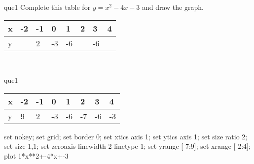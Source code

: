 \documentclass[13.5pt, varwidth=true]{beamer}
\begin{document}
\begin{frame}[shrink=19,fragile]
	\begin{beamercolorbox}[rounded=true, left, shadow=true,wd=14.8cm]{que1}
		 Complete this table for $y = x^{2} - 4x - 3$ and draw the graph. \\[0.3cm] \renewcommand{\arraystretch}{1.2}\begin{tabular}{|C|C|C|C|C|C|C|C|} \hline x & -2 & -1 & 0 & 1 & 2 & 3 & 4 \\ \hline y &  & 2 & -3 & -6 &  & -6 & \\ \hline \end{tabular}\\[0.3cm]
	\end{beamercolorbox}
\end{frame}
\begin{frame}[shrink=19,fragile]
	\begin{beamercolorbox}[rounded=true, left, shadow=true,wd=14.8cm]{que1}
		\renewcommand{\arraystretch}{1.2}\begin{tabular}{|C|C|C|C|C|C|C|C|} \hline x & -2 & -1 & 0 & 1 & 2 & 3 & 4 \\ \hline y & 9 & 2 & -3 & -6 & -7 & -6 & -3\\ \hline \end{tabular}\begin{gnuplot}[terminal=pdf] set nokey; set grid; set border 0; set xtics axis 1; set ytics axis 1; set size ratio 2; set size 1,1; set zeroaxis linewidth 2 linetype 1; set yrange [-7:9]; set xrange [-2:4]; plot 1*x**2+-4*x+-3 \end{gnuplot}
	\end{beamercolorbox}
\end{frame}
\end{document}
